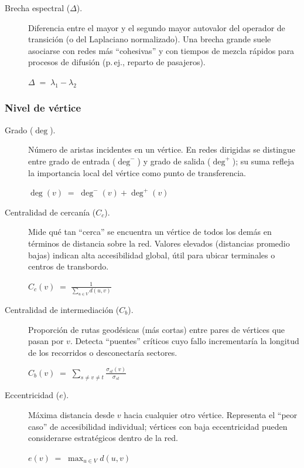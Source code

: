 \begin{description}
    \item[Brecha espectral ($\Delta$).]
    Diferencia entre el mayor y el segundo mayor autovalor del operador de transición (o del Laplaciano normalizado). Una brecha grande suele asociarse con redes más “cohesivas” y con tiempos de mezcla rápidos para procesos de difusión (p.\,ej., reparto de pasajeros).
    \begin{center}
    $\displaystyle \Delta \;=\; \lambda_{1} - \lambda_{2}$
    \end{center}

    \end{description}

    \subsubsection*{Nivel de vértice}

    \begin{description}

    \item[Grado ($\deg$).]
    Número de aristas incidentes en un vértice. En redes dirigidas se distingue entre grado de entrada ($\deg^{-}$) y grado de salida ($\deg^{+}$); su suma refleja la importancia local del vértice como punto de transferencia.
    \begin{center}
    $\displaystyle \deg(v) \;=\; \deg^{-}(v) + \deg^{+}(v)$
    \end{center}

    \item[Centralidad de cercanía ($C_c$).]
    Mide qué tan “cerca” se encuentra un vértice de todos los demás en términos de distancia sobre la red. Valores elevados (distancias promedio bajas) indican alta accesibilidad global, útil para ubicar terminales o centros de transbordo.
    \begin{center}
    $\displaystyle C_c(v) \;=\; \frac{1}{\sum_{u\in V} d(u,v)}$
    \end{center}

    \item[Centralidad de intermediación ($C_b$).]
    Proporción de rutas geodésicas (más cortas) entre pares de vértices que pasan por $v$. Detecta “puentes” críticos cuyo fallo incrementaría la longitud de los recorridos o desconectaría sectores.
    \begin{center}
    $\displaystyle C_b(v) \;=\; \sum_{s\neq v\neq t}\frac{\sigma_{st}(v)}{\sigma_{st}}$
    \end{center}

    \item[Eccentricidad ($e$).]
    Máxima distancia desde $v$ hacia cualquier otro vértice. Representa el “peor caso” de accesibilidad individual; vértices con baja eccentricidad pueden considerarse estratégicos dentro de la red.
    \begin{center}
    $\displaystyle e(v) \;=\; \max_{u\in V} d(u,v)$
    \end{center}

    \end{description}

